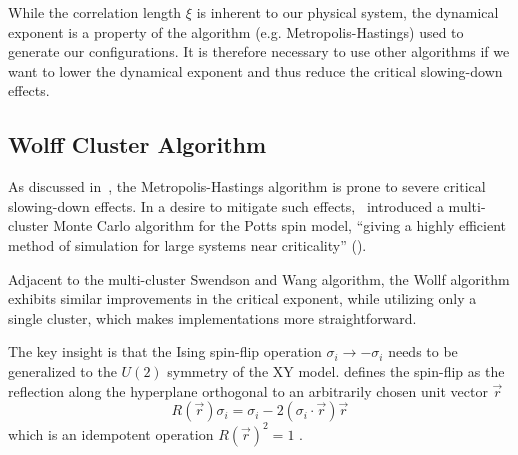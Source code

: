 		While the correlation length $\xi$ is inherent to our physical system, the dynamical exponent is a property of the algorithm (e.g. Metropolis-Hastings) used to generate our configurations. It is therefore necessary to use other algorithms if we want to lower the dynamical exponent and thus reduce the critical slowing-down effects.
		
	\subsection{Wolff Cluster Algorithm}\label{sec:theo:wolff_cluster}
		As discussed in~, the Metropolis-Hastings algorithm is prone to severe critical slowing-down effects. In a desire to mitigate such effects,~\cite{sw} introduced a multi-cluster Monte Carlo algorithm for the Potts spin model, \enquote{giving a highly efficient method of simulation for large systems near criticality} (\cite{sw}).
		
		Adjacent to the multi-cluster Swendson and Wang algorithm, the Wollf algorithm exhibits similar improvements in the critical exponent, while utilizing only a single cluster, which makes implementations more straightforward.
		
		The key insight is that the Ising spin-flip operation $\sigma_i \rightarrow -\sigma_i$ needs to be generalized to the $U(2)$ symmetry of the XY model. \cite{wolff} defines the spin-flip as the reflection along the hyperplane orthogonal to an arbitrarily chosen unit vector $\vec{r}$
		\begin{equation}
			R(\vec{r}) \sigma_i = \sigma_i - 2 (\sigma_i \cdot \vec{r}) \vec{r} 
		\end{equation}
		which is an idempotent operation $R(\vec{r})^2=1$ \cite[eq. 3]{wolff}.
	
